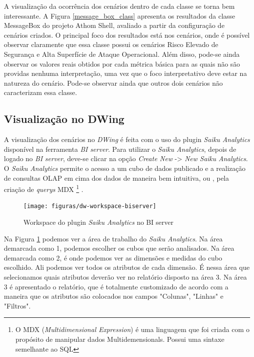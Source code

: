 A visualização da ocorrência dos cenários dentro de cada classe se torna bem interessante. A Figura \ref{message_box_class} apresenta os resultados da classe MessageBox do projeto Athom Shell, avaliado a partir da configuração de cenários criados. O principal foco dos resultados está nos cenários, onde é possível observar claramente que essa classe possui os cenários Risco Elevado de Segurança e Alta Superfície de Ataque Operacional. Além disso, pode-se ainda observar os valores reais obtidos por cada métrica básica para as quais não são providas nenhuma interpretação, uma vez que o foco interpretativo deve estar na natureza do cenário. Pode-se observar ainda que outros dois cenários não caracterizam essa classe.



\subsection{Visualização no DWing}
\label{vision-dw}

A visualização dos cenários no \emph{DWing} é feita com o uso do plugin \emph{Saiku Analytics} disponível na ferramenta \emph{BI server}. Para utilizar o \emph{Saiku Analytics}, depois de logado no \emph{BI server}, deve-se clicar na opção \emph{Create New} -> \emph{New Saiku Analytics}. O \emph{Saiku Analytics} permite o acesso a um cubo de dados publicado e a realização de consultas OLAP em cima dos dados de maneira bem intuitiva, ou , pela criação de \emph{querys} MDX
\footnote{O MDX (\emph{Multidimensional Expression}) é uma linguagem que foi criada com o propósito de manipular dados Multidemensionals. Possui uma sintaxe semelhante ao SQL}
. 

\begin{figure}[H]
	\centering
	\texttt{[image: figuras/dw-workspace-biserver]}
	\caption{Workspace do plugin \emph{Saiku Analytics} no BI server}
	\label{dw-workspace-biserver}
\end{figure}


Na Figura \ref{dw-workspace-biserver} podemos ver a área de trabalho do \emph{Saiku Analytics}. Na área demarcada como 1, podemos escolher os cubos que serão analisados. Na área demarcada como 2, é onde podemos ver as dimensões e medidas do cubo escolhido. Ali podemos ver todos os atributos de cada dimensão. É nessa área que selecionamos quais atributos deverão ver no relatório disposto na área 3. Na área 3 é apresentado o relatório, que é totalmente customizado de acordo com a maneira que os atributos são colocados nos campos "Colunas", "Linhas" e "Filtros".


